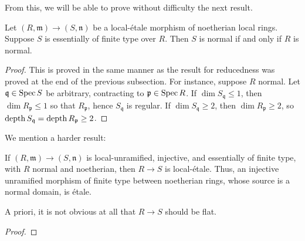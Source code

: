 From this, we will be able to prove without difficulty the next result.
\begin{proposition} \label{normalitypreserved}
Let $(R, \mathfrak{m}) \to (S, \mathfrak{n})$ be a local-\'etale morphism of noetherian local
rings. 
Suppose $S$ is essentially of finite type over $R$.
Then $S$ is normal if and only if $R$ is normal.
\end{proposition} 
\begin{proof} 
This is proved in the same manner as the result for reducedness was proved at
the end of the previous subsection.
For instance, suppose $R$ normal. Let $\mathfrak{q} \in \operatorname{Spec} S$ be arbitrary,
contracting to $\mathfrak{p} \in \operatorname{Spec} R$. If $\dim S_{\mathfrak{q}} \leq 1$,
then $\dim R_{\mathfrak{p}} \leq 1$ so that $R_{\mathfrak{p}}$, hence
$S_{\mathfrak{q}}$ is regular. If $\dim S_{\mathfrak{q}} \geq 2$, then $\dim
R_{\mathfrak{p}} \geq 2$, so 
$\operatorname{depth} S_{\mathfrak{q}} = \operatorname{depth} R_{\mathfrak{p}} \geq 2$.
\end{proof} 

We mention a harder result:

\begin{theorem} 
\label{injunrflat}
If $(R, \mathfrak{m}) \to (S, \mathfrak{n})$ is local-unramified, injective,
and essentially of finite type, with $R$ normal and noetherian, then $R \to S$ is
local-\'etale.
Thus, an injective unramified morphism of finite type between noetherian rings,
whose source is a normal domain, is \'etale.
\end{theorem} 
A priori, it is not obvious at all that $R \to S$ should be flat.
\begin{proof} 
\begin{comment}
We essentially follow \cite{Mi67} in the proof.
Clearly, only the local statement needs to be proved.

Let $K$ be the quotient field of $R$.
We have an injection $K \to S \otimes_R K$, which is  formally unramified and
essentially of finite type; thus $S
\otimes_R K$ is itself a product of finite separable extensions of $K$.
Since the map $R \to S$ is injective, so is $K \to S \otimes_R K$; in
particular, the latter is a nonzero product of field extensions of $K$. 
Now $R \to S \to S \otimes_R K$ is thus injective, by the diagram
\[ \xymatrix{
R \ar[d] \ar[r] & S \ar[d] \\
K \ar[r] &  S \otimes_R K,
}\]
where we have just seen the bottom horizontal arrow is injective, and $R
\to K$ is clearly injective. 
\end{comment}
\end{proof} 

